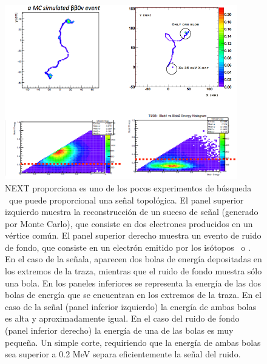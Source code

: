 \begin{figure}
\centering
\includegraphics[width=0.9\textwidth]{img/Topo2.png}
\caption{\small NEXT proporciona es uno de los pocos experimentos de búsqueda \bbonu\ que puede proporcional una señal topológica. El panel superior izquierdo muestra la reconstrucción de un suceso de señal (generado por Monte Carlo), que consiste en dos electrones producidos en un vértice común. El panel superior derecho muestra un evento de ruido de fondo, que consiste en un electrón emitido por los isótopos  \BI\ o \TL. En el caso de la señala, aparecen dos bolas de energía depositadas en los extremos de la traza, mientras que el ruido de fondo muestra sólo una bola. En los paneles inferiores se representa la energía de las dos bolas de energía que se encuentran en los extremos de la traza. En el caso de la señal (panel inferior izquierdo) la energía de ambas bolas es alta y aproximadamente igual. En el caso del ruido de fondo (panel inferior derecho) la energía de una de las bolas es muy pequeña. Un simple corte, requiriendo que la energía de ambas bolas sea superior a 0.2 MeV separa eficientemente la señal del ruido.}\label{fig.ETRK2}
\end{figure}

